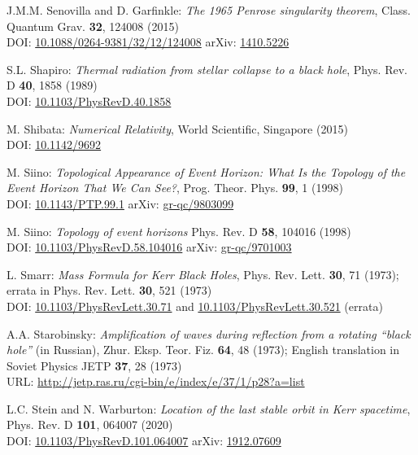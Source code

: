 \begin{thebibliography}{123}
J.M.M. Senovilla and D. Garfinkle:
{\em The 1965 Penrose singularity theorem},
Class. Quantum Grav. {\bf 32}, 124008 (2015)\\
DOI: \href{https://doi.org/10.1088/0264-9381/32/12/124008}{10.1088/0264-9381/32/12/124008}\hfill
arXiv: \href{https://arxiv.org/abs/1410.5226}{1410.5226}

S.L. Shapiro:
{\em Thermal radiation from stellar collapse to a black hole},
Phys. Rev. D {\bf 40}, 1858 (1989)\\
DOI: \href{https://doi.org/10.1103/PhysRevD.40.1858}{10.1103/PhysRevD.40.1858}

M. Shibata:
{\em Numerical Relativity},
World Scientific, Singapore (2015)\\
DOI: \href{https://doi.org/10.1142/9692}{10.1142/9692}

M. Siino: {\em Topological Appearance of Event Horizon:
What Is the Topology of the Event Horizon That We Can See?},
Prog. Theor. Phys. {\bf 99}, 1 (1998)\\
DOI: \href{https://doi.org/10.1143/PTP.99.1}{10.1143/PTP.99.1}\hfill
arXiv: \href{https://arxiv.org/abs/gr-qc/9803099}{gr-qc/9803099}

M. Siino: {\em Topology of event horizons}
Phys. Rev. D {\bf 58}, 104016 (1998)\\
DOI: \href{https://doi.org/10.1103/PhysRevD.58.104016}{10.1103/PhysRevD.58.104016}\hfill
arXiv: \href{https://arxiv.org/abs/gr-qc/9701003}{gr-qc/9701003}

L. Smarr: {\em Mass Formula for Kerr Black Holes},
Phys. Rev. Lett. {\bf 30}, 71 (1973); errata in Phys. Rev. Lett. {\bf 30}, 521 (1973)\\
DOI: \href{https://doi.org/10.1103/PhysRevLett.30.71}{10.1103/PhysRevLett.30.71}
and
\href{https://doi.org/10.1103/PhysRevLett.30.521}{10.1103/PhysRevLett.30.521} (errata)

A.A. Starobinsky:
{\em Amplification of waves during reflection from a rotating ``black hole''} (in Russian),
Zhur. Eksp. Teor. Fiz. {\bf 64}, 48 (1973); English translation in
Soviet Physics JETP {\bf 37}, 28 (1973)\\
URL: \url{http://jetp.ras.ru/cgi-bin/e/index/e/37/1/p28?a=list}

L.C. Stein and N. Warburton:
{\em Location of the last stable orbit in Kerr spacetime},
Phys. Rev. D  {\bf 101}, 064007 (2020)\\
DOI: \href{https://doi.org/10.1103/PhysRevD.101.064007}{10.1103/PhysRevD.101.064007}\hfill
arXiv: \href{https://arxiv.org/abs/1912.07609}{1912.07609}


\end{thebibliography}
